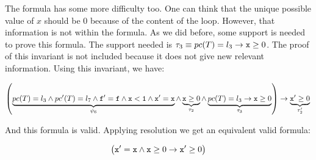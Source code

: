 	The formula has some more difficulty too.
	One can think that the unique possible value of $x$ should be $0$ because of the content of the loop.
	However, that information is not within the formula.
	As we did before, some support is needed to prove this formula.
	The support needed is $\tau_3 \equiv pc(T) = l_3 \to \mathtt{x} \geq 0$.
	The proof of this invariant is not included because it does not give new relevant information. 
	Using this invariant, we have:

	

	\begin{dmath*}[indentstep={5em}]
		\left(
			\underbrace{\pc(T) = l_3 \andcond \pc'(T) = l_7 \andcond \mathtt{f'=f} \andcond \mathtt{x<1} \andcond \mathtt{x'=x}}_{\psi_6} \andcond \underbrace{\mathtt{x} \geq 0}_{\tau_2} \andcond \underbrace{\pc(T) = l_3 \to \mathtt{x}\geq 0 }_{\tau_3}
		\right) 
			\to \underbrace{\mathtt{x}' \geq 0}_{\tau_2'}\\\\
	\end{dmath*}
	
	And this formula is valid. Applying resolution we get an equivalent valid formula:

	\[
		\left(
			\mathtt{x'=x}  \wedge \mathtt{x}\geq 0 \to \mathtt{x'}\geq 0
		\right)
	\]


